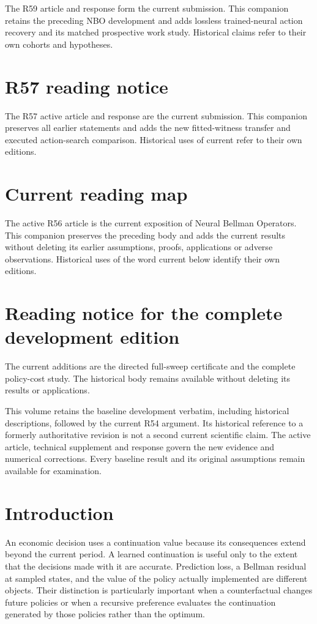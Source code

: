 \documentclass[ecta,nameyear,draft]{econsocart}
\begin{document}
The R59 article and response form the current submission. This companion retains the preceding NBO development and adds lossless trained-neural action recovery and its matched prospective work study. Historical claims refer to their own cohorts and hypotheses.

\section*{R57 reading notice}
The R57 active article and response are the current submission. This companion preserves all earlier statements and adds the new fitted-witness transfer and executed action-search comparison. Historical uses of current refer to their own editions.

\section*{Current reading map}
The active R56 article is the current exposition of Neural Bellman Operators. This companion preserves the preceding body and adds the current results without deleting its earlier assumptions, proofs, applications or adverse observations. Historical uses of the word current below identify their own editions.

\section*{Reading notice for the complete development edition}
The current additions are the directed full-sweep certificate and the complete policy-cost study. The historical body remains available without deleting its results or applications.

This volume retains the baseline development verbatim, including historical descriptions, followed by the current R54 argument. Its historical reference to a formerly authoritative revision is not a second current scientific claim. The active article, technical supplement and response govern the new evidence and numerical corrections. Every baseline result and its original assumptions remain available for examination.


\section{Introduction}\label{sec:introduction}
An economic decision uses a continuation value because its consequences extend beyond the current period. A learned continuation is useful only to the extent that the decisions made with it are accurate. Prediction loss, a Bellman residual at sampled states, and the value of the policy actually implemented are different objects. Their distinction is particularly important when a counterfactual changes future policies or when a recursive preference evaluates the continuation generated by those policies rather than the optimum.
\end{document}
